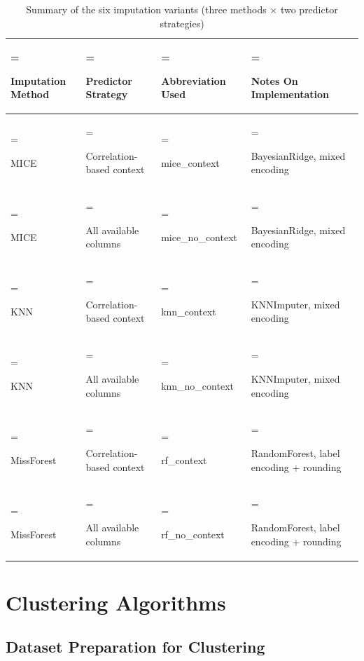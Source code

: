 \begin{table}[H]
\centering
\caption[Summary of the six imputation variants]{Summary of the six imputation variants (three methods $\times$ two predictor strategies)}
\label{tbl:imputation_variants}
\renewcommand{\arraystretch}{1.0}
\small
\begin{tabularx}{\textwidth}{|>{\hsize=0.769\hsize\linewidth=\hsize\raggedright\arraybackslash}X|>{\hsize=1.074\hsize\linewidth=\hsize\raggedright\arraybackslash}X|>{\hsize=0.857\hsize\linewidth=\hsize\raggedright\arraybackslash}X|>{\hsize=1.300\hsize\linewidth=\hsize\raggedright\arraybackslash}X|}
\hline
\textbf{Imputation Method} & \textbf{Predictor Strategy} & \textbf{Abbreviation Used} & \textbf{Notes On Implementation} \\ \hline
MICE & Correlation-based context & mice\_\hspace{0pt}context & BayesianRidge, mixed encoding \\ \hline
MICE & All available columns & mice\_\hspace{0pt}no\_\hspace{0pt}context & BayesianRidge, mixed encoding \\ \hline
KNN & Correlation-based context & knn\_\hspace{0pt}context & KNNImputer, mixed encoding \\ \hline
KNN & All available columns & knn\_\hspace{0pt}no\_\hspace{0pt}context & KNNImputer, mixed encoding \\ \hline
MissForest & Correlation-based context & rf\_\hspace{0pt}context & RandomForest, label encoding + rounding \\ \hline
MissForest & All available columns & rf\_\hspace{0pt}no\_\hspace{0pt}context & RandomForest, label encoding + rounding \\ \hline
\end{tabularx}
\end{table}

\section{Clustering Algorithms}

\subsection{Dataset Preparation for Clustering}


